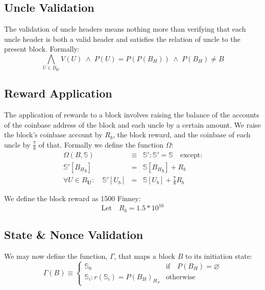 \documentclass[9pt,oneside]{amsart}
\begin{document}
\begin{multicols}{2}
\subsection{Uncle Validation}

The validation of uncle headers means nothing more than verifying that each uncle header is both a valid header and satisfies the relation of uncle to the present block. Formally:
\begin{equation}
\bigwedge_{U \in B_\mathbf{U}} V(U) \; \wedge \; P(U) = P(P(B_H)) \; \wedge \; P(B_H) \neq B
\end{equation}

\subsection{Reward Application}

The application of rewards to a block involves raising the balance of the accounts of the coinbase address of the block and each uncle by a certain amount. We raise the block's coinbase account by $R_b$, the block reward, and the coinbase of each uncle by $\frac{7}{8}$ of that. Formally we define the function $\Omega$:
\begin{eqnarray}
\Omega(B, \mathbb{S}) & \equiv & \mathbb{S}': \mathbb{S}' = \mathbb{S} \quad \text{except:} \\
\mathbb{S}'[{B_H}_b] & = & \mathbb{S}[{B_H}_b] + R_b \\
\forall U \in B_\mathbf{U}: \quad \mathbb{S}'[U_b] & = & \mathbb{S}[U_b] + \frac{7}{8}R_b
\end{eqnarray}

We define the block reward as 1500 Finney:
\begin{equation}
\text{Let} \quad R_b = 1.5 * 10^{16}
\end{equation}

\subsection{State \& Nonce Validation}

We may now define the function, $\Gamma$, that maps a block $B$ to its initiation state:
\begin{equation}
\Gamma(B) \equiv \begin{cases}
\mathbb{S}_0 & \text{if} \quad P(B_H) = \varnothing \\
\mathbb{S}_i: r(\mathbb{S}_i) = {P(B_H)_H}_r & \text{otherwise}
\end{cases}
\end{equation}


\end{multicols}
\end{document}

